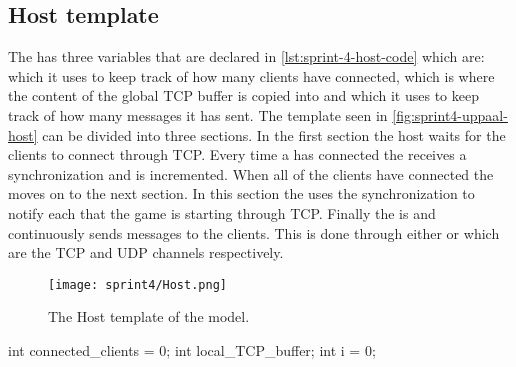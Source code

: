 \subsection*{Host template}
The  has three variables that are declared in \autoref{lst:sprint-4-host-code} which are:
 which it uses to keep track of how many clients have connected,  which is where the content of the global TCP buffer is copied into and  which it uses to keep track of how many messages it has sent. 
The template seen in \autoref{fig:sprint4-uppaal-host} can be divided into three sections.
In the first section the host waits for the clients to connect through TCP.
Every time a  has connected the  receives a  synchronization and  is incremented.
When all of the clients have connected the  moves on to the next section.
In this section the  uses the  synchronization to notify each  that the game is starting through TCP.
Finally the  is  and continuously sends messages to the clients.
This is done through either  or  which are the TCP and UDP channels respectively.
\begin{figure}[h]
    \centering
    \texttt{[image: sprint4/Host.png]}
    \caption{The Host template of the \uppaal model.}
    \label{fig:sprint4-uppaal-host}
\end{figure}

\begin{uppaalcode}[caption={local Host declarations}, label={lst:sprint-4-host-code},captionpos=b]
int connected_clients = 0;
int local_TCP_buffer;
int i = 0;
\end{uppaalcode}


